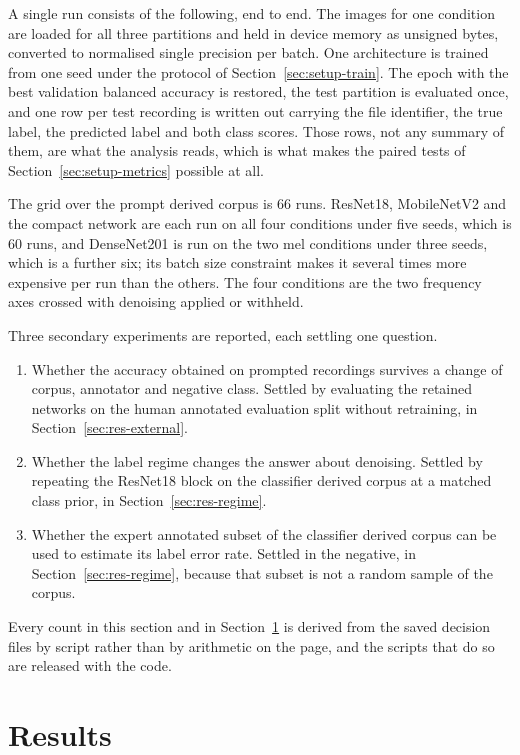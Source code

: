\documentclass[pdflatex,sn-mathphys-num]{sn-jnl}
\begin{document}
A single run consists of the following, end to end. The images for one condition are
loaded for all three partitions and held in device memory as unsigned bytes, converted to
normalised single precision per batch. One architecture is trained from one seed under
the protocol of Section~\ref{sec:setup-train}. The epoch with the best validation
balanced accuracy is restored, the test partition is evaluated once, and one row per test
recording is written out carrying the file identifier, the true label, the predicted
label and both class scores. Those rows, not any summary of them, are what the analysis
reads, which is what makes the paired tests of Section~\ref{sec:setup-metrics} possible
at all.

The grid over the prompt derived corpus is $66$ runs. ResNet18, MobileNetV2 and the
compact network are each run on all four conditions under five seeds, which is $60$ runs,
and DenseNet201 is run on the two mel conditions under three seeds, which is a further
six; its batch size constraint makes it several times more expensive per run than the
others. The four conditions are the two frequency axes crossed with denoising applied or
withheld.

Three secondary experiments are reported, each settling one question.
\begin{enumerate}
\item Whether the accuracy obtained on prompted recordings survives a change of corpus,
      annotator and negative class. Settled by evaluating the retained networks on the
      human annotated evaluation split without retraining, in
      Section~\ref{sec:res-external}.
\item Whether the label regime changes the answer about denoising. Settled by repeating
      the ResNet18 block on the classifier derived corpus at a matched class prior, in
      Section~\ref{sec:res-regime}.
\item Whether the expert annotated subset of the classifier derived corpus can be used to
      estimate its label error rate. Settled in the negative, in
      Section~\ref{sec:res-regime}, because that subset is not a random sample of the
      corpus.
\end{enumerate}

Every count in this section and in Section~\ref{sec:results} is derived from the saved
decision files by script rather than by arithmetic on the page, and the scripts that do
so are released with the code.

\section{Results}\label{sec:results}
\end{document}
